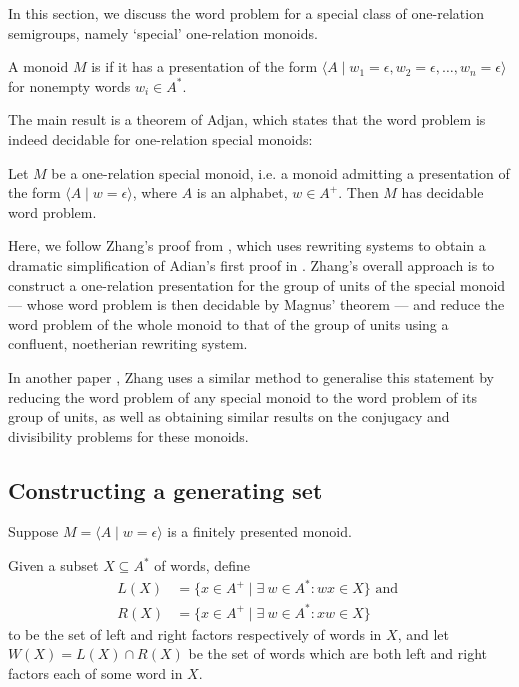\documentclass[noindex,noinsetproof,12pt]{lmaths}
\begin{document}
In this section, we discuss the word problem for a special class of one-relation semigroups, namely `special' one-relation monoids.

\begin{defn} \label{def:special}
	A monoid $M$ is  if it has a presentation of the form $\langle A \mid w_1 = \epsilon, w_2 = \epsilon, \ldots, w_n = \epsilon \rangle$ for nonempty words $w_i \in A^*$.
\end{defn}

The main result is a theorem of Adjan, which states that the word problem is indeed decidable for one-relation special monoids:

\begin{theorem}[Adjan] \label{thm:ors-decidablewp}
	Let $M$ be a one-relation special monoid, i.e. a monoid admitting a presentation of the form $\langle A \mid w = \epsilon\rangle$, where $A$ is an alphabet, $w \in A^+$. Then $M$ has decidable word problem.
\end{theorem}

Here, we follow Zhang's proof from \cite{Zhang1992a}, which uses rewriting systems to obtain a dramatic simplification of Adian's first proof in \cite{Adian1966}. Zhang's overall approach is to construct a one-relation presentation for the group of units of the special monoid --- whose word problem is then decidable by Magnus' theorem --- and reduce the word problem of the whole monoid to that of the group of units using a confluent, noetherian rewriting system.

In another paper \cite{Zhang1992}, Zhang uses a similar method to generalise this statement by reducing the word problem of any special monoid to the word problem of its group of units, as well as obtaining similar results on the conjugacy and divisibility problems for these monoids.


\subsection{Constructing a generating set}

Suppose $M = \langle A \mid w = \epsilon\rangle$ is a finitely presented monoid.

Given a subset $X \subseteq A^*$ of words, define
	\begin{align*}
		L(X) &= \{ x \in A^+ \mid \exists\ w \in A^* \colon wx \in X \} \text{ and } \\
		R(X) &= \{ x \in A^+ \mid \exists\ w \in A^* \colon xw \in X \}
	\end{align*}
to be the set of left and right factors respectively of words in $X$, and let $W(X) = L(X) \cap R(X)$ be the set of words which are both left and right factors each of some word in $X$.
\end{document}
